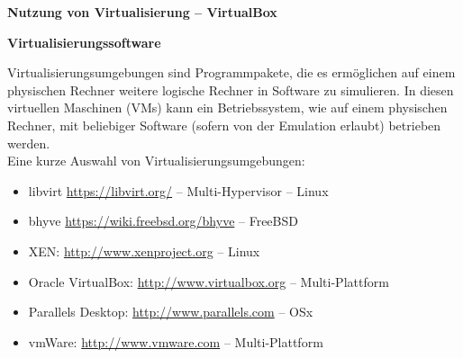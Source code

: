 \documentclass[paper=a4,fontsize=11pt]{scrartcl}%
\numberwithin{equation}{section}
\begin{document}
\begin{center}
\Large{\textbf{Nutzung von Virtualisierung -- VirtualBox}}
\end{center}
\begin{center}\Large{\textbf{Virtualisierungssoftware}}\end{center}\vskip0.25in
Virtualisierungsumgebungen sind Programmpakete, die es ermöglichen auf einem physischen Rechner weitere logische Rechner in Software zu simulieren. In diesen virtuellen Maschinen (VMs) kann ein Betriebssystem, wie auf einem physischen Rechner, mit beliebiger Software (sofern von der Emulation erlaubt) betrieben werden.\\
Eine kurze Auswahl von Virtualisierungsumgebungen:
\begin{itemize}
	\item libvirt \url{https://libvirt.org/} -- Multi-Hypervisor -- Linux
	\item bhyve \url{https://wiki.freebsd.org/bhyve} -- FreeBSD
	\item XEN: \url{http://www.xenproject.org} -- Linux
	\item Oracle VirtualBox: \url{http://www.virtualbox.org} -- Multi-Plattform
	\item Parallels Desktop: \url{http://www.parallels.com} -- OSx
	\item vmWare: \url{http://www.vmware.com} -- Multi-Plattform
\end{itemize}
\end{document}
